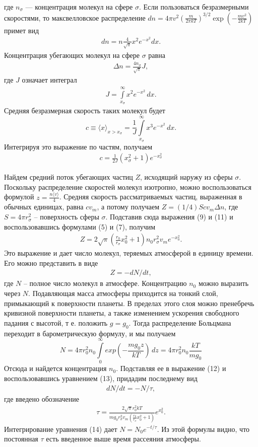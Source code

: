 \documentclass{letask}
\begin{document}
где $n_\sigma$ — концентрация молекул на сфере $\sigma$. Если пользоваться безразмерными скоростями, то максвелловское распределение $dn = 4\pi v^2 (\frac{m}{2 \pi kT})^{3/2} \exp(-\frac{mv^2}{2kT})$ примет вид
	\begin{gather}
	dn = n\frac{4}{\sqrt{\pi}}x^2e^{-x^2}dx.
	\end{gather}
Концентрация убегающих молекул на сфере $\sigma$ равна 
	\begin{gather}
	\Delta n = \frac{4n_\sigma}{\sqrt{\pi}}J,
	\end{gather}
где $J$ означает интеграл 
	\begin{gather}
	J = \int \limits_{x_\sigma}^{\infty} x^2e^{-x^2}\,dx.
	\end{gather}
Средняя безразмерная скорость таких молекул будет
	$$c \equiv \langle x \rangle_{x>x_\sigma} = \frac{1}{J} \int \limits_{x_\sigma}^{\infty} x^3e^{-x^2}\,dx.$$
Интегрируя это выражение по частям, получаем
	\begin{gather}
	c = \frac{1}{2J}(x^2_\sigma + 1)e^{-x^2_\sigma}
	\end{gather}
	
\parindent=0.5cm  Найдем средний поток убегающих частиц $Z$, исходящий наружу из сферы $\sigma$. Поскольку распределение скоростей молекул изотропно, можно воспользоваться формулой $z = \frac{n \langle v \rangle}{4}$. Средняя скорость рассматриваемых частиц, выраженная в обычных единицах, равна $cv_m$, а потому получаем $Z = (1/4)Scv_m\Delta n$, где  $ S = 4\pi r^2_\sigma$ -- поверхность сферы $\sigma$. Подставив сюда выражения (9) и (11) и воспользовавшись формулами (5) и (7), получим 
	\begin{gather}
	Z = 2\sqrt{\pi} \left(\frac{r_0}{r_\sigma}x^2_0 + 1\right) n_0r^2_\sigma v_m e^{-x^2_0}.
	\end{gather}
Это выражение и дает число молекул, теряемых атмосферой в единицу времени. Его можно представить в виде 
	\begin{gather}
	Z = -dN/dt,
	\end{gather}
где $N$ -- полное число молекул в атмосфере. Концентрацию $n_0$ можно выразить через $N$. Подавляющая масса атмосферы приходится на тонкий слой, примыкающий к поверхности планеты. В пределах этого слоя можно пренебречь кривизной поверхности планеты, а также изменением ускорения свободного падания с высотой, т е. положить $g = g_0$. Тогда распределение Больцмана переходит в барометрическую формулу, и мы получаем
	$$N = 4 \pi r^2_0 n_0 \int \limits_0^{\infty} exp\left(-\frac{mg_0z}{kT}\right)\,dz = 4 \pi r^2_0 n_0 \frac{kT}{mg_0}$$
Отсюда и найдется концентрация $n_0$. Подставляя ее в выражение (12) и воспользовавшись уравнением (13), придадим последнему вид 
	\begin{gather}
	dN/dt = -N/\tau,
	\end{gather}
где введено обозначение 
	\begin{gather}
	\tau = \frac{2\sqrt{\pi}r^2_0kT}{mg_0r^2_\sigma v_m \left(\frac{r_0}{r_\sigma}x^2_0 + 1\right)}e^{x^2_0}.
	\end{gather}
Интегрирование уравнения (14) дает $N = N_0e^{-t/\tau}.$ Из этой формулы видно, что постоянная $\tau$ есть введенное выше время рассеяния атмосферы.
\end{document}
